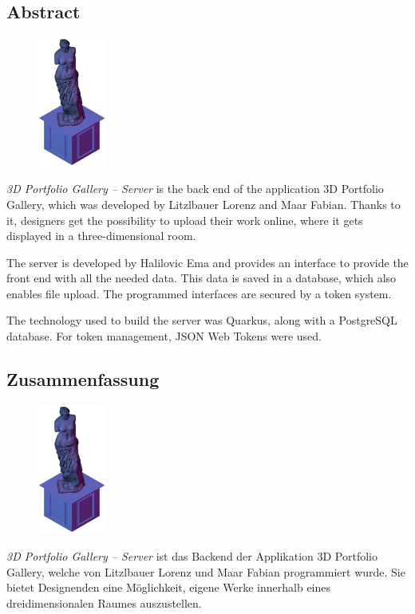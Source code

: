 \begin{spacing}{1}
    \chapter*{Abstract}
\end{spacing}
\begin{figure}
    \begin{center}
      \includegraphics[width=0.2\textwidth]{pics/statue.png}
    \end{center}
\end{figure}
\emph{3D Portfolio Gallery – Server} is the back end of the application 3D Portfolio Gallery, which was developed by Litzlbauer Lorenz and Maar Fabian.
Thanks to it, designers get the possibility to upload their work online, where it gets displayed in a three-dimensional room.


The server is developed by Halilovic Ema and provides an interface to provide the front end with all the needed data. 
This data is saved in a database, which also enables file upload. 
The programmed interfaces are secured by a token system.


The technology used to build the server was Quarkus, along with a PostgreSQL database.
For token management, JSON Web Tokens were used.
\newpage
\begin{spacing}{1}
    \chapter*{Zusammenfassung}
\end{spacing}
\begin{figure}
    \begin{center}
      \includegraphics[width=0.2\textwidth]{pics/statue.png}
    \end{center}
\end{figure}
\emph{3D Portfolio Gallery – Server} ist das Backend der Applikation 3D Portfolio Gallery, welche von Litzlbauer Lorenz und Maar Fabian programmiert wurde. 
Sie bietet Designenden eine Möglichkeit, eigene Werke innerhalb eines dreidimensionalen Raumes auszustellen. 


